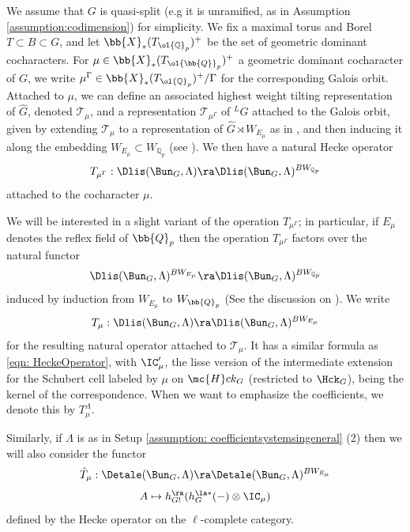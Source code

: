 \documentclass[letterpaper,11pt]{amsart}
\begin{document}
We assume that $G$ is quasi-split (e.g it is unramified, as in Assumption \ref{assumption:codimension}) for simplicity. We fix a maximal torus and Borel $T \subset B \subset G$, and let $\bb{X}_{*}(T_{\ol{\mathbb{Q}}_{p}})^{+}$ be the set of geometric dominant cocharacters. For $\mu \in \bb{X}_{*}(T_{\ol{\bb{Q}}_{p}})^{+}$ a geometric dominant cocharacter of $G$, we write $\mu^{\Gamma} \in \bb{X}_{*}(T_{\ol{\mathbb{Q}}_{p}})^{+}/\Gamma$ for the corresponding Galois orbit.  Attached to $\mu$, we can define an associated highest weight tilting representation of $\widehat{G}$, denoted $\mathcal{T}_{\mu}$, and a representation $\mathcal{T}_{\mu^{\Gamma}}$ of $\phantom{}^{L}G$ attached to the Galois orbit, given by extending $\mathcal{T}_{\mu}$ to a representation of $\widehat{G} \rtimes W_{E_{\mu}}$ as in \cite[Lemma~2.1.2]{KottwitzTOO}, and then inducing it along the embedding $W_{E_{\mu}} \subset W_{\mathbb{Q}_{p}}$ (see \cite[Section~9.1]{HamGeomES}). We then have a natural Hecke operator
\[ T_{\mu^{\Gamma}}: \Dlis(\Bun_{G},\Lambda) \ra \Dlis(\Bun_{G},\Lambda)^{BW_{\mathbb{Q}_{p}}} \]
attached to the cocharacter $\mu$. 

We will be interested in a slight variant of the operation $T_{\mu^{\Gamma}}$; in particular, if $E_{\mu}$ denotes the reflex field of $\bb{Q}_{p}$ then the operation $T_{\mu^{\Gamma}}$ factors over the natural functor 
\[ \Dlis(\Bun_{G},\Lambda)^{BW_{E_{\mu}}} \ra \Dlis(\Bun_{G},\Lambda)^{BW_{\mathbb{Q}_{p}}} \] 
induced by induction from $W_{E_{\mu}}$ to $W_{\bb{Q}_{p}}$ (See the discussion on \cite[Page~322]{FSGeomLLC}). We write
\[ T_{\mu}: \Dlis(\Bun_{G},\Lambda) \ra \Dlis(\Bun_{G},\Lambda)^{BW_{E_{\mu}}} \]
for the  resulting natural operator attached to $\mathcal{T}_{\mu}$. It has a similar formula as \eqref{eqn: HeckeOperator}, with $\IC_\mu'$, the lisse version of the intermediate extension for the Schubert cell labeled by $\mu$ on $\mc{H}ck_G$ (restricted to $\Hck_G$), being the kernel of the correspondence. When we want to emphasize the coefficients, we denote this by $T_{\mu}^{\Lambda}$.

Similarly, if $\Lambda$ is as in Setup \ref{assumption: coefficientsystemsingeneral} (2) then we will also consider the functor
\begin{equation}{\label{eqn: LCompleteHeckeOperator}}
\hat{T}_{\mu}: \Detale(\Bun_{G},\Lambda) \ra \Detale(\Bun_{G},\Lambda)^{BW_{E_{\mu}}} 
\end{equation}
\[ A \mapsto h_{G!}^{\ra}(h_{G}^{\la*}(-) \otimes \IC_\mu) \]
defined by the Hecke operator on the $\ell$-complete category.
\end{document}
